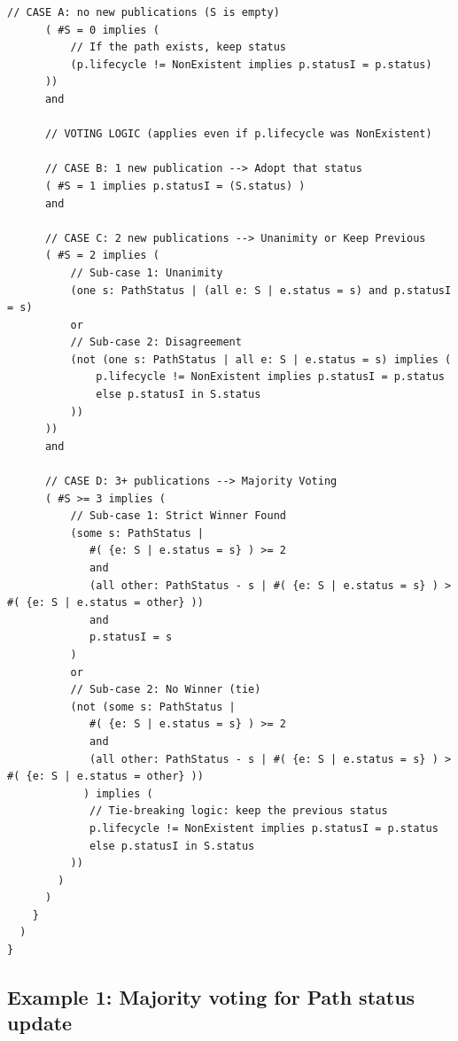 \begin{lstlisting}[language=alloy, caption=BBP Formal Model]
      // CASE A: no new publications (S is empty)
      ( #S = 0 implies (
          // If the path exists, keep status
          (p.lifecycle != NonExistent implies p.statusI = p.status)
      ))
      and

      // VOTING LOGIC (applies even if p.lifecycle was NonExistent)

      // CASE B: 1 new publication --> Adopt that status
      ( #S = 1 implies p.statusI = (S.status) )
      and

      // CASE C: 2 new publications --> Unanimity or Keep Previous
      ( #S = 2 implies (
          // Sub-case 1: Unanimity
          (one s: PathStatus | (all e: S | e.status = s) and p.statusI = s)
          or
          // Sub-case 2: Disagreement
          (not (one s: PathStatus | all e: S | e.status = s) implies (
              p.lifecycle != NonExistent implies p.statusI = p.status
              else p.statusI in S.status
          ))
      ))
      and

      // CASE D: 3+ publications --> Majority Voting
      ( #S >= 3 implies (
          // Sub-case 1: Strict Winner Found
          (some s: PathStatus |
             #( {e: S | e.status = s} ) >= 2
             and
             (all other: PathStatus - s | #( {e: S | e.status = s} ) > #( {e: S | e.status = other} ))
             and
             p.statusI = s
          )
          or
          // Sub-case 2: No Winner (tie)
          (not (some s: PathStatus |
             #( {e: S | e.status = s} ) >= 2
             and
             (all other: PathStatus - s | #( {e: S | e.status = s} ) > #( {e: S | e.status = other} ))
            ) implies (
             // Tie-breaking logic: keep the previous status
             p.lifecycle != NonExistent implies p.statusI = p.status
             else p.statusI in S.status
          ))
        )
      )
    }
  )
}
\end{lstlisting}

\subsection{Example 1: Majority voting for Path status update}

